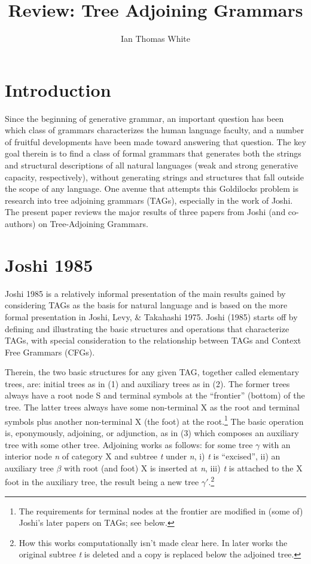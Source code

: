 \documentclass[12pt]{article}
\title{Review: Tree Adjoining Grammars}
\author{Ian Thomas White}
\date{}
\makeatletter
\renewcommand{\maketitle}
{
\begin{flushleft}
\textbf{{\large\@title}}
\newline
\@author
\end{flushleft}
}
\makeatother
\begin{document}
\thispagestyle{empty}
\maketitle
\tableofcontents
\newpage

\section{Introduction}

Since the beginning of generative grammar, an important question has been which class of grammars characterizes the human language faculty, and a number of fruitful developments have been made toward answering that question. The key goal therein is to find a class of formal grammars that generates both the strings and structural descriptions of all natural languages (weak and strong generative capacity, respectively), without generating strings and structures that fall outside the scope of any language. One avenue that attempts this Goldilocks problem is research into tree adjoining grammars (TAGs), especially in the work of Joshi. The present paper reviews the major results of three papers from Joshi (and co-authors) on Tree-Adjoining Grammars.

\section{Joshi 1985}

Joshi 1985 is a relatively informal presentation of the main results gained by considering TAGs as the basis for natural language and is based on the more formal presentation in Joshi, Levy, \& Takahashi 1975. Joshi (1985) starts off by defining and illustrating the basic structures and operations that characterize TAGs, with special consideration to the relationship between TAGs and Context Free Grammars (CFGs).

Therein, the two basic structures for any given TAG, together called elementary trees, are: initial trees as in (1) and auxiliary trees as in (2). The former trees always have a root node S and terminal symbols at the ``frontier'' (bottom) of the tree. The latter trees always have some non-terminal X as the root and terminal symbols plus another non-terminal X (the foot) at the root.\footnote{The requirements for terminal nodes at the frontier are modified in (some of) Joshi's later papers on TAGs; see below.} The basic operation is, eponymously, adjoining, or adjunction, as in (3) which composes an auxiliary tree with some other tree. Adjoining works as follows: for some tree $\gamma$ with an interior node \textit{n} of category X and subtree \textit{t} under \textit{n}, i) \textit{t} is ``excised'', ii) an auxiliary tree $\beta$ with root (and foot) X is inserted at \textit{n}, iii) \textit{t} is attached to the X foot in the auxiliary tree, the result being a new tree $\gamma'$.\footnote{ How this works computationally isn't made clear here. In later works the original subtree \textit{t} is deleted and a copy is replaced below the adjoined tree.}
\end{document}
